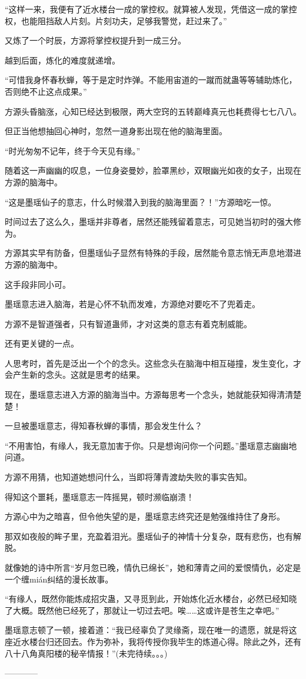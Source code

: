 \begin{this_body}
“这样一来，我便有了近水楼台一成的掌控权。就算被人发现，凭借这一成的掌控权，也能阻挡敌人片刻。片刻功夫，足够我警觉，赶过来了。”

又炼了一个时辰，方源将掌控权提升到一成三分。

越到后面，炼化的难度就递增。

“可惜我身怀春秋蝉，等于是定时炸弹。不能用宙道的一蹴而就蛊等等辅助炼化，否则绝不止这点成果。”

方源头昏脑涨，心知已经达到极限，两大空窍的五转巅峰真元也耗费得七七八八。

但正当他想抽回心神时，忽然一道身影出现在他的脑海里面。

“时光匆匆不记年，终于今天见有缘。”

随着这一声幽幽的叹息，一位身姿曼妙，脸罩黑纱，双眼幽光如夜的女子，出现在方源的脑海中。

“这是墨瑶仙子的意志，什么时候潜入到我的脑海里面？！”方源暗吃一惊。

时间过去了这么久，墨瑶并非尊者，居然还能残留着意志，可见她当初时的强大修为。

方源其实早有防备，但墨瑶仙子显然有特殊的手段，居然能令意志悄无声息地潜进方源的脑海中。

这手段非同小可。

墨瑶意志进入脑海，若是心怀不轨而发难，方源绝对要吃不了兜着走。

方源不是智道强者，只有智道蛊师，才对这类的意志有着克制威能。

还有更关键的一点。

人思考时，首先是泛出一个个的念头。这些念头在脑海中相互碰撞，发生变化，才会产生新的念头。这就是思考的结果。

现在，墨瑶意志进入方源的脑海当中。方源每思考一个念头，她就能获知得清清楚楚！

一旦被墨瑶意志，得知春秋蝉的事情，那会发生什么？

“不用害怕，有缘人，我无意加害于你。只是想询问你一个问题。”墨瑶意志幽幽地问道。

方源不用猜，也知道她想问什么，当即将薄青渡劫失败的事实告知。

得知这个噩耗，墨瑶意志一阵摇晃，顿时濒临崩溃！

方源心中为之暗喜，但令他失望的是，墨瑶意志终究还是勉强维持住了身形。

那双如夜般的眸子里，充盈着泪光。墨瑶仙子的神情十分复杂，既有悲伤，也有解脱。

就像她的诗中所言“岁月忽已晚，情仇已绵长”，她和薄青之间的爱恨情仇，必定是一个缠mián纠结的漫长故事。

“有缘人，既然你能炼成招灾蛊，又寻觅到此，开始炼化近水楼台，必然已经知晓了大概。既然他已经死了，那就让一切过去吧。唉……这或许是苍生之幸吧。”

墨瑶意志顿了一顿，接着道：“我已经辜负了灵缘斋，现在唯一的遗愿，就是将这座近水楼台归还回去。作为弥补，我将传授你我毕生的炼道心得。除此之外，还有八十八角真阳楼的秘辛情报！”(未完待续。。。)

------------

\end{this_body}

